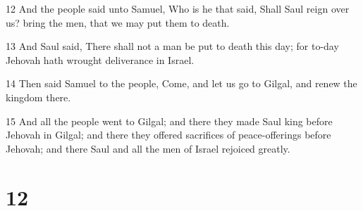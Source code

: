 \par 12 And the people said unto Samuel, Who is he that said, Shall Saul reign over us? bring the men, that we may put them to death.
\par 13 And Saul said, There shall not a man be put to death this day; for to-day Jehovah hath wrought deliverance in Israel.
\par 14 Then said Samuel to the people, Come, and let us go to Gilgal, and renew the kingdom there.
\par 15 And all the people went to Gilgal; and there they made Saul king before Jehovah in Gilgal; and there they offered sacrifices of peace-offerings before Jehovah; and there Saul and all the men of Israel rejoiced greatly.

\chapter{12}

